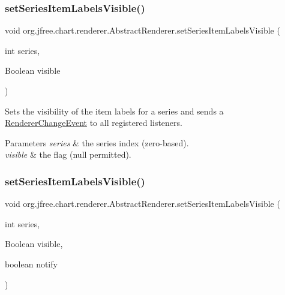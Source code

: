 \subsubsection{\texorpdfstring{set\+Series\+Item\+Labels\+Visible()}{setSeriesItemLabelsVisible()}\hspace{0.1cm}{\footnotesize\ttfamily [2/3]}}
{\footnotesize\ttfamily void org.\+jfree.\+chart.\+renderer.\+Abstract\+Renderer.\+set\+Series\+Item\+Labels\+Visible (\begin{DoxyParamCaption}\item[{int}]{series,  }\item[{Boolean}]{visible }\end{DoxyParamCaption})}

Sets the visibility of the item labels for a series and sends a \mbox{\hyperlink{}{Renderer\+Change\+Event}} to all registered listeners.


\begin{DoxyParams}{Parameters}
{\em series} & the series index (zero-\/based). \\
\hline
{\em visible} & the flag ({\ttfamily null} permitted). \\
\hline
\end{DoxyParams}
\mbox{\label{classorg_1_1jfree_1_1chart_1_1renderer_1_1_abstract_renderer_a2bf2c20394d6e1ab38eb3382e1442bdd}} 
\subsubsection{\texorpdfstring{set\+Series\+Item\+Labels\+Visible()}{setSeriesItemLabelsVisible()}\hspace{0.1cm}{\footnotesize\ttfamily [3/3]}}
{\footnotesize\ttfamily void org.\+jfree.\+chart.\+renderer.\+Abstract\+Renderer.\+set\+Series\+Item\+Labels\+Visible (\begin{DoxyParamCaption}\item[{int}]{series,  }\item[{Boolean}]{visible,  }\item[{boolean}]{notify }\end{DoxyParamCaption})}

